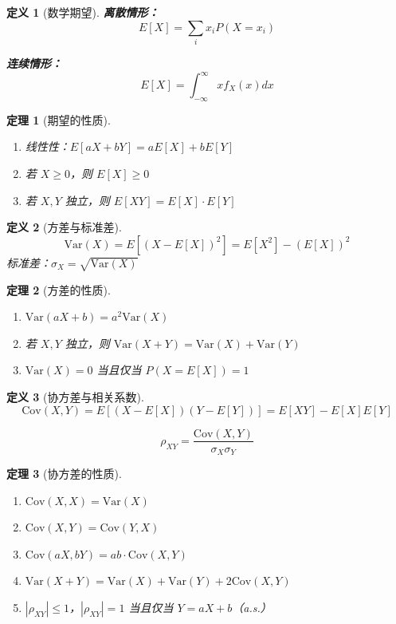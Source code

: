 \documentclass[12pt]{article}
\newtheorem{theorem}{定理}[section]
\newtheorem{definition}{定义}[section]
\begin{document}
\begin{definition}[数学期望]
\textbf{离散情形：}
$$E[X] = \sum_{i} x_i P(X = x_i)$$

\textbf{连续情形：}
$$E[X] = \int_{-\infty}^{\infty} x f_X(x) dx$$
\end{definition}

\begin{theorem}[期望的性质]
\begin{enumerate}
\item 线性性：$E[aX + bY] = aE[X] + bE[Y]$
\item 若 $X \geq 0$，则 $E[X] \geq 0$
\item 若 $X, Y$ 独立，则 $E[XY] = E[X] \cdot E[Y]$
\end{enumerate}
\end{theorem}

\begin{definition}[方差与标准差]
$$\text{Var}(X) = E[(X - E[X])^2] = E[X^2] - (E[X])^2$$
标准差：$\sigma_X = \sqrt{\text{Var}(X)}$
\end{definition}

\begin{theorem}[方差的性质]
\begin{enumerate}
\item $\text{Var}(aX + b) = a^2 \text{Var}(X)$
\item 若 $X, Y$ 独立，则 $\text{Var}(X + Y) = \text{Var}(X) + \text{Var}(Y)$
\item $\text{Var}(X) = 0$ 当且仅当 $P(X = E[X]) = 1$
\end{enumerate}
\end{theorem}

\begin{definition}[协方差与相关系数]
$$\text{Cov}(X, Y) = E[(X - E[X])(Y - E[Y])] = E[XY] - E[X]E[Y]$$

$$\rho_{XY} = \frac{\text{Cov}(X, Y)}{\sigma_X \sigma_Y}$$
\end{definition}

\begin{theorem}[协方差的性质]
\begin{enumerate}
\item $\text{Cov}(X, X) = \text{Var}(X)$
\item $\text{Cov}(X, Y) = \text{Cov}(Y, X)$
\item $\text{Cov}(aX, bY) = ab \cdot \text{Cov}(X, Y)$
\item $\text{Var}(X + Y) = \text{Var}(X) + \text{Var}(Y) + 2\text{Cov}(X, Y)$
\item $|\rho_{XY}| \leq 1$，$|\rho_{XY}| = 1$ 当且仅当 $Y = aX + b$（a.s.）
\end{enumerate}
\end{theorem}
\end{document}
